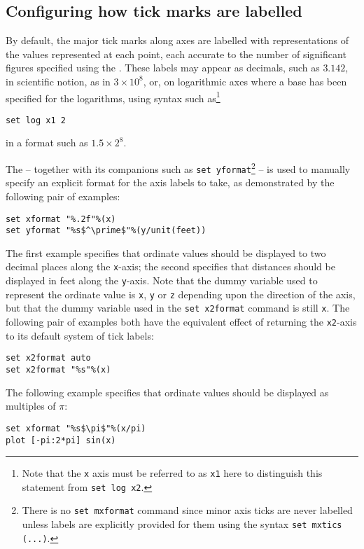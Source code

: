\subsection{Configuring how tick marks are labelled}
\label{sec:set_xformat}

By default, the major tick marks along axes are labelled with representations
of the values represented at each point, each accurate to the number of
significant figures specified using the . These
labels may appear as decimals, such as $3.142$, in scientific notion, as in
$3\times10^8$, or, on logarithmic axes where a base has been specified for the
logarithms, using syntax such as\footnote{Note that the {\tt x} axis must be
referred to as {\tt x1} here to distinguish this statement from {\tt set log
x2}.}
\begin{verbatim}
set log x1 2
\end{verbatim}
in a format such as $1.5\times2^8$.

The  -- together with its companions such as {\tt set
yformat}\footnote{There is no {\tt set mxformat} command since minor axis ticks
are never labelled unless labels are explicitly provided for them using the
syntax {\tt set mxtics (...)}.} -- is used to manually specify an explicit
format for the axis labels to take, as demonstrated by the following pair of
examples:
\begin{verbatim}
set xformat "%.2f"%(x)
set yformat "%s$^\prime$"%(y/unit(feet))
\end{verbatim}
The first example specifies that ordinate values should be displayed to two
decimal places along the {\tt x}-axis; the second specifies that distances should
be displayed in feet along the {\tt y}-axis. Note that the dummy variable used to
represent the ordinate value is {\tt x}, {\tt y} or {\tt z} depending upon the
direction of the axis, but that the dummy variable used in the {\tt set
x2format} command is still {\tt x}. The following pair of examples both have
the equivalent effect of returning the {\tt x2}-axis to its default system of
tick labels:
\begin{verbatim}
set x2format auto
set x2format "%s"%(x)
\end{verbatim}

The following example specifies that ordinate values should be displayed as
multiples of $\pi$:
\begin{verbatim}
set xformat "%s$\pi$"%(x/pi)
plot [-pi:2*pi] sin(x)
\end{verbatim}

